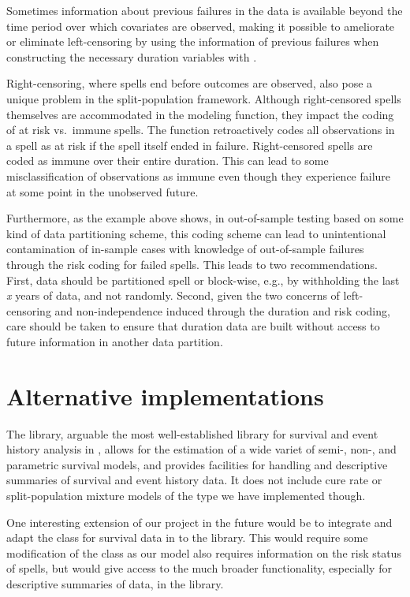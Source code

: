 \documentclass[article]{jss}
\begin{document}
Sometimes information about previous failures in the data is available
beyond the time period over which covariates are observed, making it
possible to ameliorate or eliminate left-censoring by using the
information of previous failures when constructing the necessary
duration variables with .

Right-censoring, where spells end before outcomes are observed, also
pose a unique problem in the split-population framework. Although
right-censored spells themselves are accommodated in the modeling
function, they impact the coding of at risk vs.~immune spells. The
 function retroactively codes all observations in
a spell as at risk if the spell itself ended in failure. Right-censored
spells are coded as immune over their entire duration. This can lead to
some misclassification of observations as immune even though they
experience failure at some point in the unobserved future.

Furthermore, as the example above shows, in out-of-sample testing based
on some kind of data partitioning scheme, this coding scheme can lead to
unintentional contamination of in-sample cases with knowledge of
out-of-sample failures through the risk coding for failed spells. This
leads to two recommendations. First, data should be partitioned spell or
block-wise, e.g., by withholding the last \emph{x} years of data, and
not randomly. Second, given the two concerns of left-censoring and
non-independence induced through the duration and risk coding, care
should be taken to ensure that duration data are built without access to
future information in another data partition.

\section{Alternative implementations}

The  library, arguable the most well-established library for survival and event history analysis in , allows for the estimation of a wide variet of semi-, non-, and parametric survival models, and provides facilities for handling and descriptive summaries of survival and event history data. It does not include cure rate or split-population mixture models of the type we have implemented though.

One interesting extension of our project in the future would be to integrate and adapt the  class for survival data in  to the  library. This would require some modification of the class as our model also requires information on the risk status of spells, but would give access to the much broader functionality, especially for descriptive summaries of data, in the  library. 
\end{document}
